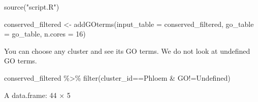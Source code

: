 \documentclass[
  letterpaper,
  DIV=11,
  numbers=noendperiod]{scrartcl}
\newenvironment{Shaded}{\begin{snugshade}}{\end{snugshade}}
\newcommand{\AttributeTok}[1]{\textcolor[rgb]{0.40,0.45,0.13}{#1}}
\newcommand{\DecValTok}[1]{\textcolor[rgb]{0.68,0.00,0.00}{#1}}
\newcommand{\FunctionTok}[1]{\textcolor[rgb]{0.28,0.35,0.67}{#1}}
\newcommand{\NormalTok}[1]{\textcolor[rgb]{0.00,0.23,0.31}{#1}}
\newcommand{\OtherTok}[1]{\textcolor[rgb]{0.00,0.23,0.31}{#1}}
\newcommand{\SpecialCharTok}[1]{\textcolor[rgb]{0.37,0.37,0.37}{#1}}
\newcommand{\StringTok}[1]{\textcolor[rgb]{0.13,0.47,0.30}{#1}}
\begin{document}
\begin{Shaded}
\begin{Highlighting}[]
\FunctionTok{source}\NormalTok{(}\StringTok{"script.R"}\NormalTok{)}
\end{Highlighting}
\end{Shaded}

\begin{Shaded}
\begin{Highlighting}[]
\NormalTok{conserved\_filtered }\OtherTok{\textless{}{-}} \FunctionTok{addGOterms}\NormalTok{(}\AttributeTok{input\_table =}\NormalTok{ conserved\_filtered,}
                                \AttributeTok{go\_table =}\NormalTok{ go\_table,}
                                \AttributeTok{n.cores =} \DecValTok{16}\NormalTok{)}
\end{Highlighting}
\end{Shaded}

You can choose any cluster and see its GO terms. We do not look at
undefined GO terms.

\begin{Shaded}
\begin{Highlighting}[]
\NormalTok{conserved\_filtered }\SpecialCharTok{\%\textgreater{}\%} \FunctionTok{filter}\NormalTok{(cluster\_id}\SpecialCharTok{==}\StringTok{\textquotesingle{}Phloem\textquotesingle{}} \SpecialCharTok{\&}\NormalTok{ GO}\SpecialCharTok{!=}\StringTok{\textquotesingle{}Undefined\textquotesingle{}}\NormalTok{)}
\end{Highlighting}
\end{Shaded}

A data.frame: 44 × 5
\end{document}
